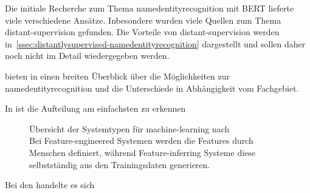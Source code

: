 Die initiale Recherche zum Thema \gls{namedentityrecognition}
mit \gls{BERT}
lieferte viele verschiedene Ansätze.
Inbesondere wurden viele Quellen zum Thema \gls{distant-supervision}
gefunden.
Die Vorteile von \gls{distant-supervision}
werden in~\ref{ssec:distantlysupervised-namedentityrecognition}
dargestellt
und sollen daher noch nicht im Detail wiedergegeben werden.

\citeauthor{1910.11470} bieten in 
einen breiten Überblick über die Möglichkeiten zur \gls{namedentityrecognition}
und die Unterschiede in Abhängigkeit vom Fachgebiet.

In \autocite[Table 1]{1910.11470} ist die Aufteilung am einfachsten zu erkennen

\begin{figure}[ht]
	\nocite{latexdraw:trees}
	\begin{tcolorbox}[tfigurestyle]
		\begin{center}
			
		\end{center}
	\end{tcolorbox}
	\caption[%
        Übersicht der Systemtypen für %
    ]{
		Übersicht der Systemtypen für \gls{machine-learning} nach \autocite[Table 1]{1910.11470}\\
        Bei Feature-engineered Systemen werden die Features durch Menschen definiert,
        während Feature-inferring Systeme diese selbstständig aus den Trainingsdaten generieren.
	}%
	\label{fig:model:types}
\end{figure}

Bei den  handelte es sich

\FloatBarrier